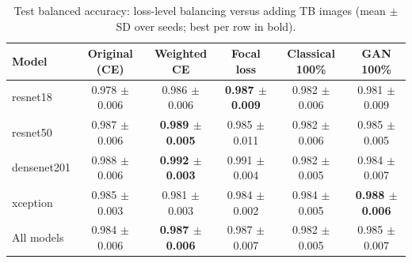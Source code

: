 \begin{table}[htbp]
\centering
\caption{Test balanced accuracy: loss-level balancing versus adding TB images (mean $\pm$ SD over seeds; best per row in bold).}
\label{tab:loss_balanced_accuracy}
\begin{tabular}{lccccc}
\toprule
Model & Original (CE) & Weighted CE & Focal loss & Classical 100\% & GAN 100\% \\
\midrule
resnet18 & 0.978 $\pm$ 0.006 & 0.986 $\pm$ 0.006 & \textbf{0.987 $\pm$ 0.009} & 0.982 $\pm$ 0.006 & 0.981 $\pm$ 0.009 \\
resnet50 & 0.987 $\pm$ 0.006 & \textbf{0.989 $\pm$ 0.005} & 0.985 $\pm$ 0.011 & 0.982 $\pm$ 0.006 & 0.985 $\pm$ 0.005 \\
densenet201 & 0.988 $\pm$ 0.006 & \textbf{0.992 $\pm$ 0.003} & 0.991 $\pm$ 0.004 & 0.982 $\pm$ 0.005 & 0.984 $\pm$ 0.007 \\
xception & 0.985 $\pm$ 0.003 & 0.981 $\pm$ 0.003 & 0.984 $\pm$ 0.002 & 0.984 $\pm$ 0.005 & \textbf{0.988 $\pm$ 0.006} \\
\midrule
All models & 0.984 $\pm$ 0.006 & \textbf{0.987 $\pm$ 0.006} & 0.987 $\pm$ 0.007 & 0.982 $\pm$ 0.005 & 0.985 $\pm$ 0.007 \\
\bottomrule
\end{tabular}
\end{table}